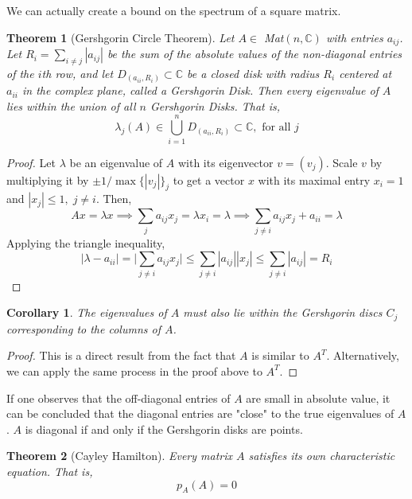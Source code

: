 \documentclass{article}
\newtheorem{theorem}{Theorem}[section]
\newtheorem{corollary}{Corollary}[theorem]
\theoremstyle{remark}
\theoremstyle{definition}
\begin{document}
    We can actually create a bound on the spectrum of a square matrix. 

    \begin{theorem}[Gershgorin Circle Theorem]
    Let $A \in $ Mat$(n, \mathbb{C})$ with entries $a_{i j}$. Let $R_i = \sum_{i \neq j} |a_{i j}|$ be the sum of the absolute values of the non-diagonal entries of the $i$th row, and let $D_(a_{i i}, R_i) \subset \mathbb{C}$ be a closed disk with radius $R_i$ centered at $a_{i i}$ in the complex plane, called a \textit{Gershgorin Disk}. Then every eigenvalue of $A$ lies within the union of all $n$ Gershgorin Disks. That is, 
    \[ \lambda_j (A) \in \bigcup_{i= 1}^{n} D_(a_{i i}, R_i) \subset \mathbb{C}, \text{ for all } j\]
    \end{theorem}

    \begin{proof}
    Let $\lambda$ be an eigenvalue of $A$ with its eigenvector $v = (v_j)$. Scale $v$ by multiplying it by $ \pm 1 / \max{\{|v_j|\}_j}$ to get a vector $x$ with its maximal entry $x_i = 1$ and $|x_j| \leq 1, \; j \neq i$. Then, 
    \[A x = \lambda x \implies \sum_{j} a_{i j} x_j = \lambda x_i = \lambda \implies \sum_{j \neq i} a_{i j} x_j + a_{i i} = \lambda\]
    Applying the triangle inequality, 
    \[| \lambda - a_{i i} | = \bigg| \sum_{j \neq i} a_{i j} x_j\bigg| \leq \sum_{j \neq i} |a_{i j}| |x_j| \leq \sum_{j \neq i} |a_{i j}| = R_i\]
    \end{proof}

    \begin{corollary}
    The eigenvalues of $A$ must also lie within the Gershgorin discs $C_j$ corresponding to the columns of $A$. 
    \end{corollary}

    \begin{proof}
    This is a direct result from the fact that $A$ is similar to $A^T$. Alternatively, we can apply the same process in the proof above to $A^T$.
    \end{proof} 

    If one observes that the off-diagonal entries of $A$ are small in absolute value, it can be concluded that the diagonal entries are "close" to the true eigenvalues of $A$. $A$ is diagonal if and only if the Gershgorin disks are points. 

    \begin{theorem}[Cayley Hamilton]
    Every matrix $A$ satisfies its own characteristic equation. That is, 
    \[ p_{A}(A) = 0\]\
    \end{theorem} 
\end{document}
